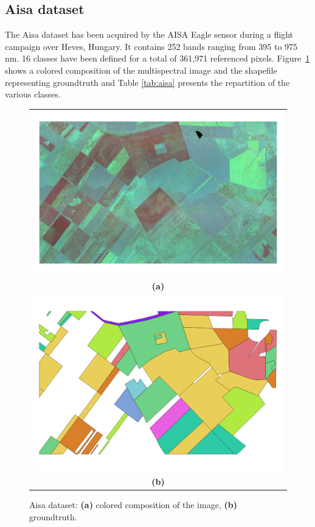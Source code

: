 \documentclass[journal,peerreview,onecolumn]{IEEEtran}
\begin{document}
    \subsection{Aisa dataset}
    \label{sec:aisa-dataset}
    The Aisa dataset has been acquired by the AISA Eagle sensor during a flight campaign over Heves, Hungary. It contains 252 bands ranging from 395 to 975 nm. 16 classes have been defined for a total of 361,971 referenced pixels. Figure~\ref{fig:aisa} shows a colored composition of the multispectral image and the shapefile representing groundtruth and Table \ref{tab:aisa} presents the repartition of the various classes.

    \begin{figure}[!t]
        \centering
        \begin{tabular}{c}
            \includegraphics[width=0.7\columnwidth]{Fig/aisa.png} \\
            {\bfseries{(a)}} \\
            \includegraphics[width=0.7\columnwidth]{Fig/aisa_gt.png} \\
            {\bfseries{(b)}} \\
        \end{tabular}
        \caption{Aisa dataset: {\bfseries{(a)}} colored composition of the image, {\bfseries{(b)}} groundtruth.\label{fig:aisa}}
    \end{figure}
\end{document}
